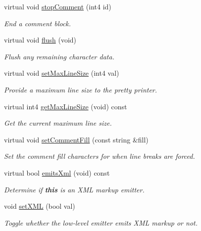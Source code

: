 \begin{DoxyCompactItemize}
virtual void \mbox{\hyperlink{class_emit_pretty_print_ad87969dcd6426529f85890b8ed6bb687}{stop\+Comment}} (int4 id)
\begin{DoxyCompactList}\small\item\em End a comment block. \end{DoxyCompactList}\item 
virtual void \mbox{\hyperlink{class_emit_pretty_print_a4537a56174d63dfc806c8b599181723b}{flush}} (void)
\begin{DoxyCompactList}\small\item\em Flush any remaining character data. \end{DoxyCompactList}\item 
virtual void \mbox{\hyperlink{class_emit_pretty_print_a998863b23c0a4a8e8f8c061453fffaf7}{set\+Max\+Line\+Size}} (int4 val)
\begin{DoxyCompactList}\small\item\em Provide a maximum line size to the pretty printer. \end{DoxyCompactList}\item 
virtual int4 \mbox{\hyperlink{class_emit_pretty_print_a32cde009472958f2b1350ed8461c979e}{get\+Max\+Line\+Size}} (void) const
\begin{DoxyCompactList}\small\item\em Get the current maximum line size. \end{DoxyCompactList}\item 
virtual void \mbox{\hyperlink{class_emit_pretty_print_a6e429a78f31bc1e30f902dbd4de21006}{set\+Comment\+Fill}} (const string \&fill)
\begin{DoxyCompactList}\small\item\em Set the comment fill characters for when line breaks are forced. \end{DoxyCompactList}\item 
virtual bool \mbox{\hyperlink{class_emit_pretty_print_a03f3c3650dc9ff7e4d472285d82569ee}{emits\+Xml}} (void) const
\begin{DoxyCompactList}\small\item\em Determine if {\bfseries{this}} is an X\+ML markup emitter. \end{DoxyCompactList}\item 
void \mbox{\hyperlink{class_emit_pretty_print_a6807c90766479cc6c03c8b0c40a8708f}{set\+X\+ML}} (bool val)
\begin{DoxyCompactList}\small\item\em Toggle whether the low-\/level emitter emits X\+ML markup or not. \end{DoxyCompactList}\end{DoxyCompactItemize}
